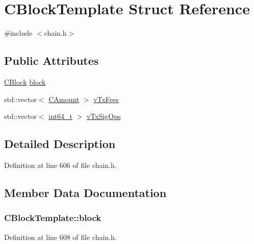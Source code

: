 \hypertarget{struct_c_block_template}{}\section{C\+Block\+Template Struct Reference}
\label{struct_c_block_template}


{\ttfamily \#include $<$chain.\+h$>$}

\subsection*{Public Attributes}
\begin{DoxyCompactItemize}
\item 
\hyperlink{class_c_block}{C\+Block} \hyperlink{struct_c_block_template_a13261cbac4dc94f996d1b3ff78e41139}{block}
\item 
std\+::vector$<$ \hyperlink{amount_8h_a4eaf3a5239714d8c45b851527f7cb564}{C\+Amount} $>$ \hyperlink{struct_c_block_template_a66287bde795cc8e8c8cb59c4e2302d49}{v\+Tx\+Fees}
\item 
std\+::vector$<$ \hyperlink{stdint_8h_adec1df1b8b51cb32b77e5b86fff46471}{int64\+\_\+t} $>$ \hyperlink{struct_c_block_template_a13326eb92a7d2fc073d9f5660dfcdde5}{v\+Tx\+Sig\+Ops}
\end{DoxyCompactItemize}


\subsection{Detailed Description}


Definition at line 606 of file chain.\+h.



\subsection{Member Data Documentation}
\hypertarget{struct_c_block_template_a13261cbac4dc94f996d1b3ff78e41139}{}
\subsubsection[{block}]{ C\+Block\+Template\+::block}\label{struct_c_block_template_a13261cbac4dc94f996d1b3ff78e41139}


Definition at line 608 of file chain.\+h.

